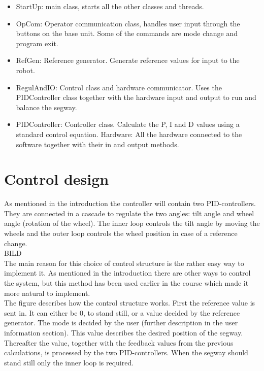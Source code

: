 \documentclass[a4paper]{article}
\begin{document}
\begin{itemize}
\item StartUp: main class, starts all the other classes and threads.
\item OpCom: Operator communication class, handles user input through the buttons on the base unit. Some of the commands are mode change and program exit. 
\item RefGen: Reference generator. Generate reference values for input to the robot. 
\item RegulAndIO: Control class and hardware communicator. Uses the PIDController class together with the hardware input and output to run and balance the segway.
\item PIDController: Controller class. Calculate the P, I and D values using a standard control equation.
Hardware: All the hardware connected to the software together with their in and output methods.
\end{itemize}

\section{Control design}
As mentioned in the introduction the controller will contain two PID-controllers. They are connected in a cascade to regulate the two angles: tilt angle and wheel angle (rotation of the wheel). The inner loop controls the tilt angle by moving the wheels and the outer loop controls the wheel position in case of a reference change.\\

BILD\\

The main reason for this choice of control structure is the rather easy way to implement it. As mentioned in the introduction there are other ways to control the system, but this method has been used earlier in the course which made it more natural to implement. \\

The figure describes how the control structure works. First the reference value is sent in. It can either be 0, to stand still, or a value decided by the reference generator. The mode is decided by the user (further description in the user information section). This value describes the desired position of the segway. Thereafter the value, together with the feedback values from the previous calculations, is processed by the two PID-controllers. When the segway should stand still only the inner loop is required. \\
\end{document}
